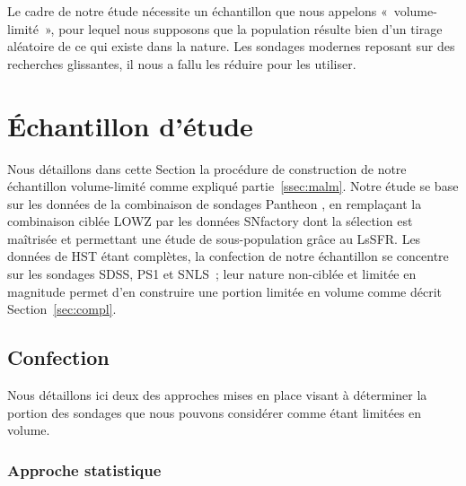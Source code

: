 \documentclass[../main/main.tex]{subfiles}
\begin{document}
Le cadre de notre étude nécessite un échantillon que nous appelons
«~volume-limité~», pour lequel nous supposons que la population résulte bien
d'un tirage aléatoire de ce qui existe dans la nature. Les sondages modernes
reposant sur des recherches glissantes, il nous a fallu les réduire pour les
utiliser.

\section{Échantillon d'étude}\label{sec:sample}

Nous détaillons dans cette Section la procédure de construction de notre
échantillon volume-limité comme expliqué partie~\ref{ssec:malm}. Notre étude se
base sur les données de la combinaison de sondages Pantheon \citep{scolnic2018},
en remplaçant la combinaison ciblée LOWZ par les données SNfactory dont la
sélection est maîtrisée et permettant une étude de sous-population grâce au
LsSFR. Les données de HST étant complètes, la confection de notre échantillon se
concentre sur les sondages SDSS, PS1 et SNLS~; leur nature non-ciblée et limitée
en magnitude permet d'en construire une portion limitée en volume comme décrit
Section~\ref{sec:compl}.

\subsection{Confection}\label{ssec:cuts}

Nous détaillons ici deux des approches mises en place visant à déterminer la
portion des sondages que nous pouvons considérer comme étant limitées en volume.

\subsubsection{Approche statistique}\label{sssec:baserate}
\end{document}
